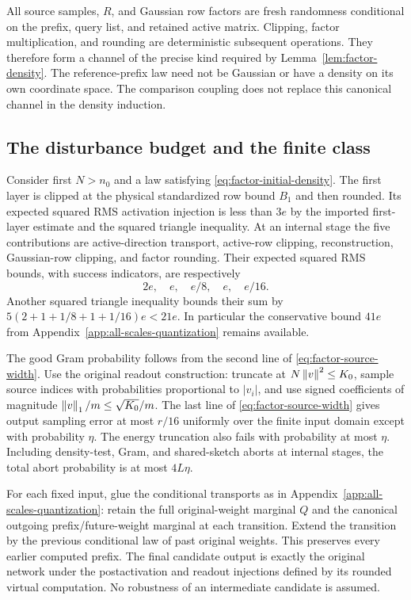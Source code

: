 All source samples, $R$, and Gaussian row factors are fresh randomness
conditional on the prefix, query list, and retained active matrix.
Clipping, factor multiplication, and rounding are deterministic subsequent
operations. They therefore form a channel of the precise kind required
by Lemma~\ref{lem:factor-density}. The reference-prefix law need not be
Gaussian or have a density on its own coordinate space. The comparison
coupling does not replace this canonical channel in the density induction.

\subsection{The disturbance budget and the finite class}

Consider first $N>n_0$ and a law satisfying
\eqref{eq:factor-initial-density}. The first layer is clipped at the
physical standardized row bound $B_1$ and then rounded. Its expected
squared RMS activation injection is less than $3e$ by the imported
first-layer estimate and the squared triangle inequality.
At an internal stage the five contributions are active-direction
transport, active-row clipping, reconstruction, Gaussian-row clipping,
and factor rounding. Their expected squared RMS bounds, with success
indicators, are respectively
\[
 2e,\quad e,\quad e/8,\quad e,\quad e/16.
\]
Another squared triangle inequality bounds their sum by
$5(2+1+1/8+1+1/16)e<21e$. In particular the conservative bound $41e$
from Appendix~\ref{app:all-scales-quantization} remains available.

The good Gram probability follows from the second line of
\eqref{eq:factor-source-width}. Use the original readout construction:
truncate at $N\left\|v\right\|^2\le K_0$, sample source indices with probabilities
proportional to $|v_i|$, and use signed coefficients of magnitude
$\left\|v\right\|_1/m\le\sqrt{K_0}/m$. The last line of
\eqref{eq:factor-source-width} gives output sampling error at most $r/16$
uniformly over the finite input domain except with probability $\eta$.
The energy truncation also fails with probability at most $\eta$.
Including density-test, Gram, and shared-sketch aborts at internal stages,
the total abort probability is at most $4L\eta$.

For each fixed input, glue the conditional transports as in
Appendix~\ref{app:all-scales-quantization}: retain the full original-weight
marginal $Q$ and the canonical outgoing prefix/future-weight marginal at
each transition. Extend the transition by the previous conditional law of
past original weights. This preserves every earlier computed prefix.
The final candidate output is exactly the original network under the
postactivation and readout injections defined by its rounded virtual
computation. No robustness of an intermediate candidate is assumed.

